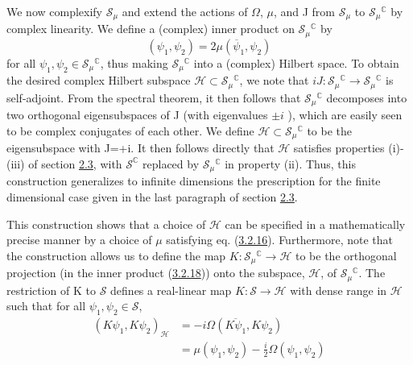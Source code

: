 \documentclass[11pt,a4paper]{article}
\begin{document}
We now complexify \(\mathcal{S}_{\mu}\) and extend the actions of \(\Omega\), \(\mu\), and J from \(\mathcal{S}_{\mu}\) to \(\mathcal{S}_{\mu}{}^{\mathbb C}\) by complex linearity. We define a (complex) inner product on \(\mathcal{S}_{\mu}{}^{\mathbb C}\) by
\begin{equation*}
(\psi_1, \psi_2) = 2\mu(\overline{\psi}_1, \psi_2) \tag{3.2.18}\label{eq:3.2.18}
\end{equation*}
for all \(\psi_1,\psi_2\in \mathcal{S}_\mu{}^\mathbb{C}\), thus making \(\mathcal{S}_\mu{}^\mathbb{C}\) into a (complex) Hilbert space. To obtain the desired complex Hilbert subspace \(\mathcal{H}\subset \mathcal{S}_\mu{}^\mathbb{C}\), we note that \(iJ:\mathcal{S}_\mu{}^\mathbb{C}\to\mathcal{S}_\mu{}^\mathbb{C}\) is self-adjoint. From the spectral theorem, it then follows that \(\mathcal{S}_\mu{}^\mathbb{C}\) decomposes into two orthogonal eigensubspaces of J (with eigenvalues \(\pm i\) ), which are easily seen to be complex conjugates of each other. We define \(\mathcal{H}\subset \mathcal{S}_\mu{}^\mathbb{C}\) to be the eigensubspace with J=+i. It then follows directly that \(\mathcal{H}\) satisfies properties (i)-(iii) of section \hyperlink{sec:2.3}{2.3}, with \(\mathcal{S}^\mathbb{C}\) replaced by \(\mathcal{S}_\mu{}^\mathbb{C}\) in property (ii). Thus, this construction generalizes to infinite dimensions the prescription for the finite dimensional case given in the last paragraph of section \hyperlink{sec:2.3}{2.3}.

This construction shows that a choice of \(\mathcal{H}\) can be specified in a mathematically precise manner by a choice of \(\mu\) satisfying eq. (\hyperref[eq:3.2.16]{3.2.16}). Furthermore, note that the construction allows us to define the map \(K: \mathcal{S}_{\mu}{}^{\mathbb{C}} \to \mathcal{H}\) to be the orthogonal projection (in the inner product (\hyperref[eq:3.2.18]{3.2.18})) onto the subspace, \(\mathcal{H}\), of \(\mathcal{S}_{\mu}{}^{\mathbb{C}}\). The restriction of K to \(\mathcal{S}\) defines a real-linear map \(K: \mathcal{S} \to \mathcal{H}\) with dense range in \(\mathcal{H}\) such that for all \(\psi_1, \psi_2 \in \mathcal{S}\),
\begin{equation*}
\begin{aligned} (K\psi_1, K\psi_2)_{\mathcal{H}} & = - i\Omega(\overline{K\psi_1}, K\psi_2) \\ & = \mu(\psi_1, \psi_2) - \frac{i}{2} \Omega(\psi_1, \psi_2) \end{aligned} \tag{3.2.19}\label{eq:3.2.19}
\end{equation*}
\end{document}

